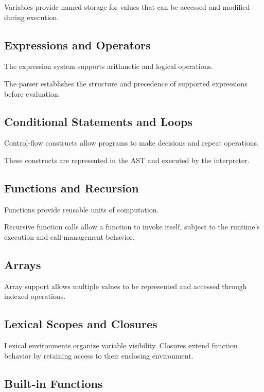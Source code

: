 \documentclass[conference]{IEEEtran}
\begin{document}
Variables provide named storage for values that
can be accessed and modified during execution.

\subsection{Expressions and Operators}

The expression system supports arithmetic and
logical operations.

The parser establishes the structure and precedence
of supported expressions before evaluation.

\subsection{Conditional Statements and Loops}

Control-flow constructs allow programs to make
decisions and repeat operations.

These constructs are represented in the AST and
executed by the interpreter.

\subsection{Functions and Recursion}

Functions provide reusable units of computation.

Recursive function calls allow a function to
invoke itself, subject to the runtime's execution
and call-management behavior.

\subsection{Arrays}

Array support allows multiple values to be
represented and accessed through indexed operations.

\subsection{Lexical Scopes and Closures}

Lexical environments organize variable visibility.
Closures extend function behavior by retaining
access to their enclosing environment.

\subsection{Built-in Functions}
\end{document}
